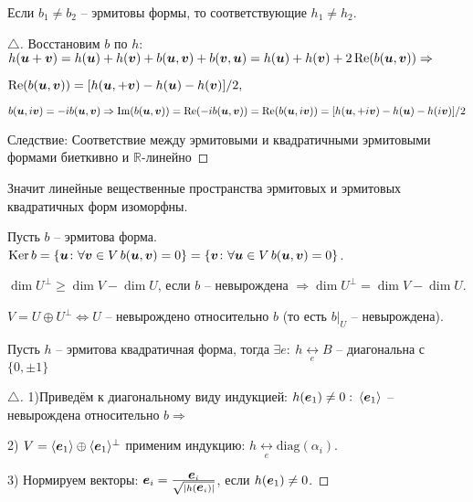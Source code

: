 \begin{to_lem}
	Если $b_1 \neq b_2$ -- эрмитовы формы, то соответствующие $h_1 \neq h_2$.
\end{to_lem}

\begin{proof}[$\triangle$]
	Восстановим $b$ по $h$: $h(\mbox{\boldmath $u$} + \mbox{\boldmath $v$}) = h(\mbox{\boldmath $u$}) + h(\mbox{\boldmath $v$}) + b(\mbox{\boldmath $u$}, \mbox{\boldmath $v$}) + b(\mbox{\boldmath $v$}, \mbox{\boldmath $u$}) = h(\mbox{\boldmath $u$}) + h(\mbox{\boldmath $v$}) + 2\mathop{\mathrm{Re}}\nolimits (b(\mbox{\boldmath $u$},\mbox{\boldmath $v$})) \Rightarrow$

	$\mathop{\mathrm{Re}}\nolimits(b(\mbox{\boldmath $u$}, \mbox{\boldmath $v$})) = [h(\mbox{\boldmath $u$}, + \mbox{\boldmath $v$}) - h(\mbox{\boldmath $u$}) - h(\mbox{\boldmath $v$})]/2,$

	$b(\mbox{\boldmath $u$},i \mbox{\boldmath $v$}) = - i b(\mbox{\boldmath $u$}, \mbox{\boldmath $v$}) \Rightarrow\mathop{\mathrm{Im}}\nolimits (b(\mbox{\boldmath $u$},\mbox{\boldmath $v$})) = \mathop{\mathrm{Re}}\nolimits (-i b(\mbox{\boldmath $u$},\mbox{\boldmath $v$})) = \mathop{\mathrm{Re}}\nolimits (b(\mbox{\boldmath $u$}, i \mbox{\boldmath $v$})) = [h(\mbox{\boldmath $u$}, + i \mbox{\boldmath $v$}) - h(\mbox{\boldmath $u$}) - h(i \mbox{\boldmath $v$})]/2$

	Следствие: Соответствие между эрмитовыми и квадратичными эрмитовыми формами биеткивно и $\mathbb{R}$-линейно 
\end{proof}

Значит линейные вещественные пространства эрмитовых и эрмитовых квадратичных форм изоморфны.

Пусть $b$ -- эрмитова форма. $\mathop{\mathrm{Ker}}\nolimits b = \{\mbox{\boldmath $u$} \colon \forall \mbox{\boldmath $v$} \in V\, b(\mbox{\boldmath $u$},\mbox{\boldmath $v$}) = 0\} = \{\mbox{\boldmath $v$}\colon \forall \mbox{\boldmath $u$} \in V\, b(\mbox{\boldmath $u$},\mbox{\boldmath $v$})=0\}$.

$\dim U^\bot \geq \dim V - \dim U$, если $b$ -- невырождена $\Longrightarrow \dim U^\bot = \dim V - \dim U$.

$V = U \oplus U^\bot \Longleftrightarrow U$ -- невырождено относительно $b$ (то есть $b\big|_U$ -- невырождена).

\begin{to_thr} 
	Пусть $h$ -- эрмитова квадратичная форма, тогда $\exists e:\: h \underset{e}{\longleftrightarrow} B$ -- диагональна с $\{0, \pm 1\}$	 
\end{to_thr}

\begin{proof}[$\triangle$]
	1)Приведём к диагональному виду индукцией: $h(\mbox{\boldmath $e$}_1) \neq 0:\: \langle \mbox{\boldmath $e$}_1\rangle$ -- невырождена относительно $b \Longrightarrow$

	2) $V = \langle \mbox{\boldmath $e$}_1\rangle \oplus \langle \mbox{\boldmath $e$}_1\rangle^\bot$ применим индукцию: $h \underset{e}{\longleftrightarrow}\text{diag}(\alpha_i)$.

	3) Нормируем векторы: $\mbox{\boldmath $e$}_i = \frac{\mbox{\boldmath $e$}_i}{\sqrt{|h (\mbox{\boldmath $e$}_i)|}}$, если $h(\mbox{\boldmath $e$}_1) \neq 0$.
\end{proof}

